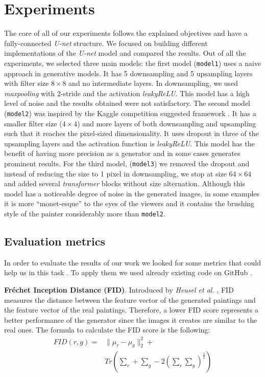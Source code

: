 \documentclass[10pt,twocolumn,letterpaper]{article}
\begin{document}
\section{Experiments}
The core of all of our experiments follows the explained objectives and have a fully-connected \textit{U-net} structure. We focused on building different implementations of the \textit{U-net} model and compared the results. Out of all the experiments, we selected three main models: the first model (\texttt{model1}) uses a naive approach in generative models. It has 5 downsampling and 5 upsampling layers with filter size $8 \times 8$ and no intermediate layers. In downsampling, we used \textit{maxpooling} with 2-stride and the activation \textit{leakyReLU}. This model has a high level of noise and the results obtained were not satisfactory. The second model (\texttt{model2}) was inspired by the Kaggle competition suggested framework \cite{kaggle}. It has a smaller filter size ($4 \times 4$) and more layers of both downsampling and upsampling such that it reaches the pixel-sized dimensionality. It uses dropout in three of the upsampling layers and the activation function is \textit{leakyReLU}. This model has the benefit of having more precision as a generator and in some cases generates prominent results. For the third model, (\texttt{model3}) we removed the dropout and instead of reducing the size to 1 pixel in downsampling, we stop at size $64 \times 64$ and added several \textit{transformer} blocks without size alternation. Although this model has a noticeable degree of noise in the generated images, in some examples it is more “monet-esque” to the eyes of the viewers and it contains the brushing style of the painter considerably more than \texttt{model2}. 

\subsection{Evaluation metrics}
In order to evaluate the results of our work we looked for some metrics that could help us in this task \cite{metrics}. To apply them we used already existing code on GitHub \cite{metricsRepo}.

\textbf{Fréchet Inception Distance (FID)}. Introduced by \textit{Heusel et al.} \cite{fid}, FID measures the distance between the feature vector of the generated paintings and the feature vector of the real paintings. Therefore, a lower FID score represents a better performance of the generator since the images it creates are similar to the real ones. The formula to calculate the FID score is the following:
\begin{equation}
	\begin{split}
		\textstyle FID(r, g) = & \| \mu_{r} - \mu_{g} \| _{2}^{2} + \\ 
			& \textstyle Tr(\sum_{r} +  \sum_{g} - 2(\sum_{r}\sum_{g})^\frac{1}{2})
	\end{split}
\end{equation}
 
\end{document}
